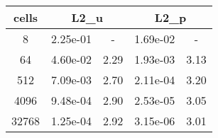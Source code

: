 \documentclass[10pt]{report}
\begin{document}
\begin{table}[H]
\begin{center}
\begin{tabular}{|c|c|c|c|c|} \hline
cells & 
\multicolumn{2}{|c|}{L2_u} & 
\multicolumn{2}{|c|}{L2_p}\\ \hline
8 & 2.25e-01 & - & 1.69e-02 & -\\ \hline
64 & 4.60e-02 & 2.29 & 1.93e-03 & 3.13\\ \hline
512 & 7.09e-03 & 2.70 & 2.11e-04 & 3.20\\ \hline
4096 & 9.48e-04 & 2.90 & 2.53e-05 & 3.05\\ \hline
32768 & 1.25e-04 & 2.92 & 3.15e-06 & 3.01\\ \hline
\end{tabular}
\end{center}
\end{table}
\end{document}
